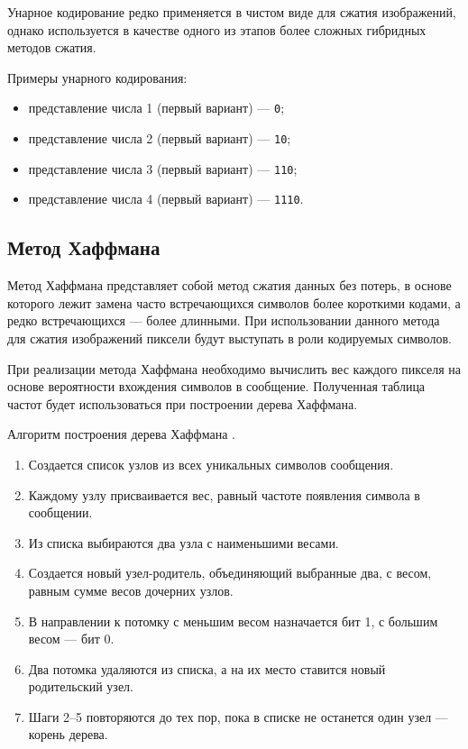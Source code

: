 Унарное кодирование редко применяется в чистом виде для сжатия изображений, однако используется в качестве одного из этапов более сложных гибридных методов сжатия.

Примеры унарного кодирования:
\begin{itemize}
    \item представление числа 1 (первый вариант) --- \texttt{0};
    \item представление числа 2 (первый вариант) --- \texttt{10};
    \item представление числа 3 (первый вариант) --- \texttt{110};
    \item представление числа 4 (первый вариант) --- \texttt{1110}.
\end{itemize}

\subsection{Метод Хаффмана}

Метод Хаффмана \cite{Huffman} представляет собой метод сжатия данных без потерь, в основе которого лежит замена часто встречающихся символов более короткими кодами, а редко встречающихся --- более длинными. При использовании данного метода для сжатия изображений пиксели будут выступать в роли кодируемых символов.  

При реализации метода Хаффмана необходимо вычислить вес каждого пикселя на основе вероятности вхождения символов в сообщение. Полученная таблица частот будет использоваться при построении дерева Хаффмана.

Алгоритм построения дерева Хаффмана \cite{Huffman-2}.
\begin{enumerate}
    \item Создается список узлов из всех уникальных символов сообщения.
    \item Каждому узлу присваивается вес, равный частоте появления символа в сообщении.
    \item Из списка выбираются два узла с наименьшими весами.
    \item Создается новый узел-родитель, объединяющий выбранные два, с весом, равным сумме весов дочерних узлов.
    \item В направлении к потомку с меньшим весом назначается бит 1, с большим весом --- бит 0.
    \item Два потомка удаляются из списка, а на их место ставится новый родительский узел.
    \item Шаги 2--5 повторяются до тех пор, пока в списке не останется один узел --- корень дерева.
\end{enumerate}

